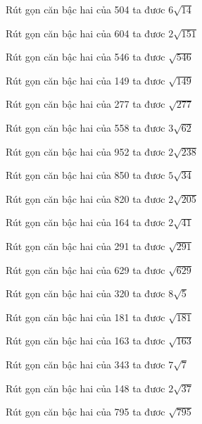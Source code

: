 \documentclass[12pt,a4paper]{article}
\begin{document}
\begin{ex}
Rút gọn căn bậc hai của 504 ta đươc $6\sqrt{14}$
\end{ex}
\begin{ex}
Rút gọn căn bậc hai của 604 ta đươc $2\sqrt{151}$
\end{ex}
\begin{ex}
Rút gọn căn bậc hai của 546 ta đươc $\sqrt{546}$
\end{ex}
\begin{ex}
Rút gọn căn bậc hai của 149 ta đươc $\sqrt{149}$
\end{ex}
\begin{ex}
Rút gọn căn bậc hai của 277 ta đươc $\sqrt{277}$
\end{ex}
\begin{ex}
Rút gọn căn bậc hai của 558 ta đươc $3\sqrt{62}$
\end{ex}
\begin{ex}
Rút gọn căn bậc hai của 952 ta đươc $2\sqrt{238}$
\end{ex}
\begin{ex}
Rút gọn căn bậc hai của 850 ta đươc $5\sqrt{34}$
\end{ex}
\begin{ex}
Rút gọn căn bậc hai của 820 ta đươc $2\sqrt{205}$
\end{ex}
\begin{ex}
Rút gọn căn bậc hai của 164 ta đươc $2\sqrt{41}$
\end{ex}
\begin{ex}
Rút gọn căn bậc hai của 291 ta đươc $\sqrt{291}$
\end{ex}
\begin{ex}
Rút gọn căn bậc hai của 629 ta đươc $\sqrt{629}$
\end{ex}
\begin{ex}
Rút gọn căn bậc hai của 320 ta đươc $8\sqrt{5}$
\end{ex}
\begin{ex}
Rút gọn căn bậc hai của 181 ta đươc $\sqrt{181}$
\end{ex}
\begin{ex}
Rút gọn căn bậc hai của 163 ta đươc $\sqrt{163}$
\end{ex}
\begin{ex}
Rút gọn căn bậc hai của 343 ta đươc $7\sqrt{7}$
\end{ex}
\begin{ex}
Rút gọn căn bậc hai của 148 ta đươc $2\sqrt{37}$
\end{ex}
\begin{ex}
Rút gọn căn bậc hai của 795 ta đươc $\sqrt{795}$
\end{ex}
\end{document}
